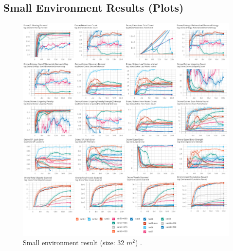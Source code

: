 \subsection{Small Environment Results (Plots)}
\begin{figure}[!ht]
        \centering
        \includegraphics[width=1\textwidth]{images/results_baseAgent.png}
        \caption{Small environment result (size: 32 $m^2$) .
        }
        \label{fig:results-small-env-performances}
\end{figure}

